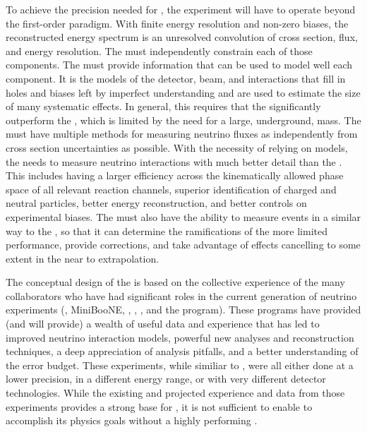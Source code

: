 To achieve the precision needed for , the experiment will have to operate beyond the first-order paradigm. With finite energy resolution and non-zero biases, the reconstructed energy spectrum is an unresolved convolution of cross section, flux, and energy resolution. The  must independently constrain each of those components.  The  must provide information that can be used to model well each component. It is the models of the detector, beam, and interactions that fill in holes and biases left by imperfect understanding and are used to estimate the size of many systematic effects.  In general, this requires that the  significantly outperform the , which is limited by the need for a large, underground, mass. The  must have multiple methods for measuring neutrino fluxes as independently from cross section uncertainties as possible. With the necessity of relying on models, the  needs to measure neutrino interactions with much better detail than the . This includes having a larger efficiency across the kinematically allowed phase space of all relevant reaction channels, superior identification of charged and neutral particles, better energy reconstruction, and better controls on experimental biases. The  must also have the ability to measure events in a similar way to the , so that it can determine the ramifications of the more limited  performance, provide corrections, and take advantage of effects cancelling to some extent in the near to  extrapolation.

The conceptual design of the  is based on the collective experience of the many  collaborators who have had significant roles in the current generation of neutrino experiments (, MiniBooNE, , , , and the  program).  These programs have provided (and will provide) a wealth of useful data and experience that has led to improved neutrino interaction models, powerful new analyses and reconstruction techniques, a deep appreciation of analysis pitfalls, and a better understanding of the error budget. 
These experiments, while similiar to , were all either done at a lower precision, in a different energy range, or with very different detector technologies. While the existing and projected experience and data from those experiments provides a strong base for , it is not sufficient to enable  to accomplish its physics goals without a highly performing .  

